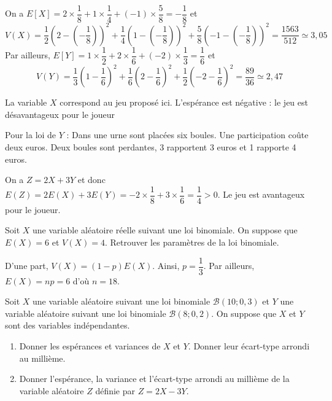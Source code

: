 \documentclass[11pt,fleqn, openany]{book} %
\begin{document}
\begin{solution}On a  $E[X] = 2 \times \dfrac{1}{8} + 1 \times \dfrac{1}{4} + (-1) \times \dfrac{5}{8} = -\dfrac{1}{8}$ et
\[ V(X)= \dfrac{1}{2}\left(2- \left(-\dfrac{1}{8}\right)\right)^2+\dfrac{1}{4}\left(1-\left(-\dfrac{1}{8}\right)\right)^2+\dfrac{5}{8}\left(-1-\left(-\dfrac{1}{8}\right)\right)^2 = \dfrac{1563}{512}\simeq 3,05\]
Par ailleurs, $E[Y]=1 \times \dfrac{1}{2}+ 2 \times \dfrac{1}{6} + (-2) \times \dfrac{1}{3} = \dfrac{1}{6}$ et
\[ V(Y)= \dfrac{1}{3}\left(1- \dfrac{1}{6}\right)^2+\dfrac{1}{6}\left(2-\dfrac{1}{6}\right)^2+\dfrac{1}{2}\left(-2-\dfrac{1}{6}\right)^2 = \dfrac{89}{36}\simeq 2,47\]

La variable $X$ correspond au jeu proposé ici. L'espérance est négative : le jeu est désavantageux pour le joueur

Pour la loi de $Y$ : Dans une urne sont placées six boules. Une participation coûte deux euros. Deux boules sont perdantes, 3 rapportent 3 euros et 1 rapporte 4 euros.

On a $Z=2X+3Y$ et donc $E(Z)=2E(X)+ 3 E(Y)= -2\times \dfrac{1}{8} + 3 \times \dfrac{1}{6}=\dfrac{1}{4}>0$. Le jeu est avantageux pour le joueur.\end{solution}




\begin{exercise}Soit $X$ une variable aléatoire réelle suivant une loi binomiale. On suppose que $E(X)=6$ et $V(X)=4$. Retrouver les paramètres de la loi binomiale.\end{exercise}

\begin{solution}D'une part, $V(X)=(1-p)E(X)$. Ainsi, $p=\dfrac{1}{3}$. Par ailleurs, $E(X)=np=6$ d'où $n=18$.\end{solution}



\begin{exercise}
Soit $X$ une variable aléatoire suivant une loi binomiale $\mathcal{B}(10 ; 0,3)$ et $Y$ une variable aléatoire suivant une loi binomiale $\mathcal{B}(8;0,2)$. On suppose que $X$ et $Y$ sont des variables indépendantes.
\begin{enumerate}
\item Donner les espérances et variances de $X$ et $Y$. Donner leur écart-type arrondi au millième.
\item Donner l'espérance, la variance et l'écart-type arrondi au millième de la variable aléatoire $Z$ définie par $Z=2X-3Y$.
\end{enumerate}\end{exercise}
\end{document}
